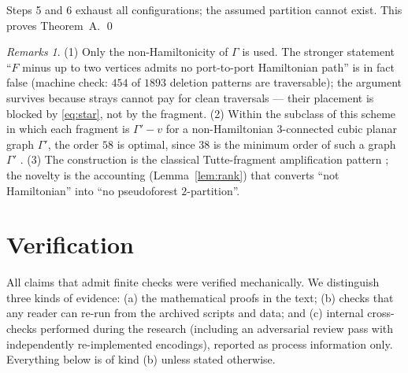 \documentclass[11pt]{article}
\theoremstyle{remark}
\newtheorem*{remarks}{Remarks}
\begin{document}
Steps 5 and 6 exhaust all configurations; the assumed partition cannot
exist. This proves Theorem~A. \qed

\begin{remarks}
(1) Only the non-Hamiltonicity of $\Gamma$ is used. The stronger
statement ``$F$ minus up to two vertices admits no port-to-port
Hamiltonian path'' is in fact false (machine check: $454$ of $1893$
deletion patterns are traversable); the argument survives because strays
cannot pay for clean traversals --- their placement is blocked by
\eqref{eq:star}, not by the fragment.
(2) Within the subclass of this scheme in which each fragment is
$\Gamma'-v$ for a non-Hamiltonian $3$-connected cubic planar graph
$\Gamma'$, the order $58$ is optimal, since $38$ is the minimum order
of such a graph $\Gamma'$ \cite{HM88}.
(3) The construction is the classical Tutte-fragment amplification
pattern \cite{Tutte46}; the novelty is the accounting
(Lemma~\ref{lem:rank}) that converts ``not Hamiltonian'' into ``no
pseudoforest $2$-partition''.
\end{remarks}

\section{Verification}\label{sec:verif}

All claims that admit finite checks were verified mechanically. We
distinguish three kinds of evidence: (a) the mathematical proofs in the
text; (b) checks that any reader can re-run from the archived scripts
and data; and (c) internal cross-checks performed during the research
(including an adversarial review pass with independently re-implemented
encodings), reported as process information only. Everything below is
of kind (b) unless stated otherwise.
\end{document}
